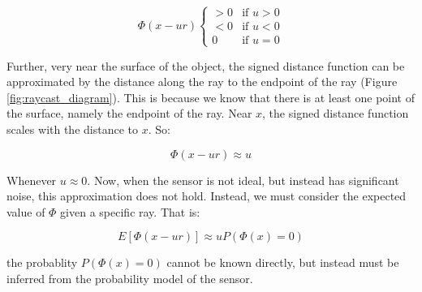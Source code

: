 \documentclass[conference,10pt]{IEEEtran}
\begin{document}
$$ \Phi(x - ur) 
     \begin{cases}
     > 0 & \text{if } u > 0 \\
     < 0 & \text{if } u < 0 \\
     0 & \text{if } u = 0
     \end{cases}
     $$

Further, very near the surface of the object, the signed distance function can
be approximated by the distance along the ray to the endpoint of  the ray
(Figure \ref{fig:raycast_diagram}). This is because we know that there is at
least one point of the surface, namely the endpoint of the ray.  Near $x$, the
signed distance function scales with the distance to $x$. So:

$$ \Phi(x - ur) \approx u $$

\noindent Whenever $u \approx 0$.  Now, when the sensor is not ideal, but
instead has significant noise, this approximation does not hold. Instead, we
must consider the expected value of $ \Phi $ given a specific ray. That is:

$$ E[\Phi(x - ur)] \approx u P(\Phi(x) = 0) $$

\noindent the probablity $P(\Phi(x) = 0)$ cannot be known directly, but instead
must be inferred from the probability model of the sensor.
\end{document}
